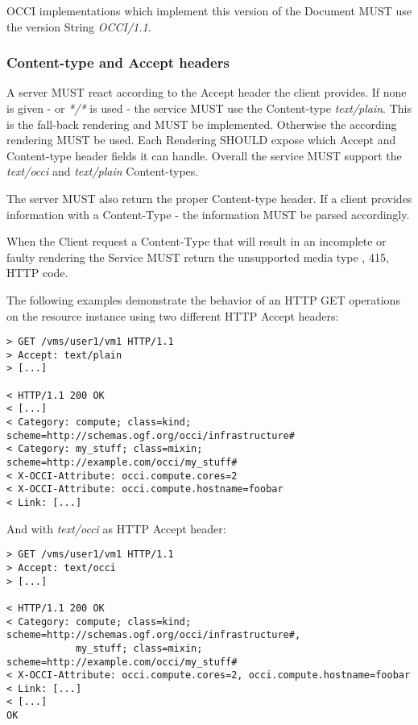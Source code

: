 \documentclass[10pt,a4paper]{article}
\begin{document}
OCCI implementations which implement this version of the Document MUST
use the version String \emph{OCCI/1.1}.

\subsubsection{Content-type and Accept headers}
A server MUST react according to the Accept header the client
provides. If none is given - or \textit{*/*} is used - the service MUST
use the Content-type \emph{text/plain}. This is the fall-back
rendering and MUST be implemented. Otherwise the according rendering
MUST be used. Each Rendering SHOULD expose which Accept and
Content-type header fields it can handle. Overall the service MUST
support the \textit{text/occi} and \textit{text/plain} Content-types.

The server MUST also return the proper Content-type header. If a
client provides information with a Content-Type - the information MUST
be parsed accordingly.

When the Client request a Content-Type that will result in an
incomplete or faulty rendering the Service MUST return the unsupported
media type , 415, HTTP code.

The following examples demonstrate the behavior of an HTTP GET
operations on the resource instance \emph{} using two different HTTP
Accept headers:

\begin{verbatim}
> GET /vms/user1/vm1 HTTP/1.1
> Accept: text/plain
> [...]
 
< HTTP/1.1 200 OK
< [...]
< Category: compute; class=kind; scheme=http://schemas.ogf.org/occi/infrastructure#
< Category: my_stuff; class=mixin; scheme=http://example.com/occi/my_stuff#
< X-OCCI-Attribute: occi.compute.cores=2
< X-OCCI-Attribute: occi.compute.hostname=foobar
< Link: [...]
\end{verbatim}

And with \emph{text/occi} as HTTP Accept header:

\begin{verbatim}
> GET /vms/user1/vm1 HTTP/1.1
> Accept: text/occi
> [...]
 
< HTTP/1.1 200 OK
< Category: compute; class=kind; scheme=http://schemas.ogf.org/occi/infrastructure#,
            my_stuff; class=mixin; scheme=http://example.com/occi/my_stuff#
< X-OCCI-Attribute: occi.compute.cores=2, occi.compute.hostname=foobar
< Link: [...]
< [...]
OK
\end{verbatim}
\end{document}
